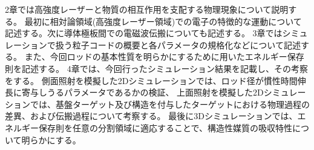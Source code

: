 \documentclass[a4paper,11pt,titlepage]{jsarticle}
\begin{document}
  2章では高強度レーザーと物質の相互作用を支配する物理現象について説明する。
  最初に相対論領域(高強度レーザー領域)での電子の特徴的な運動について記述する。次に導体極板間での電磁波伝搬についても記述する。
  3章ではシミュレーションで扱う粒子コードの概要と各パラメータの規格化などについて記述する。
  また、今回ロッドの基本性質を明らかにするために用いたエネルギー保存則を記述する。
  4章では、今回行ったシミュレーション結果を記載し、その考察をする。
  側面照射を模擬した2Dシミュレーションでは、ロッド径が慣性時間伸長に寄与しうるパラメータであるかの検証、
  上面照射を模擬した2Dシミュレーションでは、基盤ターゲット及び構造を付与したターゲットにおける物理過程の差異、および伝搬過程について考察する。
  最後に3Dシミュレーションでは、エネルギー保存則を任意の分割領域に適応することで、構造性媒質の吸収特性について明らかにする。

\end{document}
